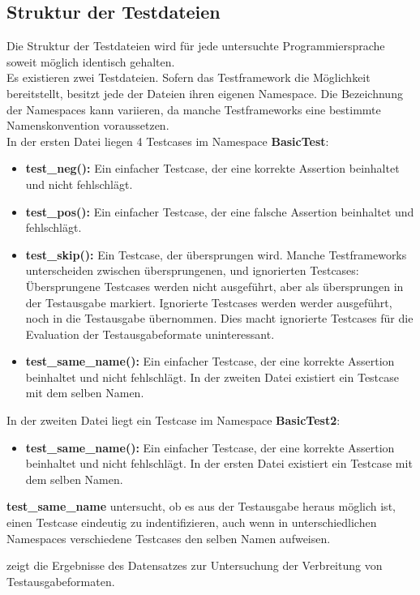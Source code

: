 \subsection{Struktur der Testdateien}
Die Struktur der Testdateien wird für jede untersuchte Programmiersprache soweit möglich identisch gehalten.\\
Es existieren zwei Testdateien. Sofern das Testframework die Möglichkeit bereitstellt, besitzt jede der Dateien ihren eigenen Namespace. Die Bezeichnung der Namespaces kann variieren, da manche Testframeworks eine bestimmte Namenskonvention voraussetzen.\\
In der ersten Datei liegen 4 Testcases im Namespace \textbf{BasicTest}:
\begin{itemize}
    \item \textbf{test\_neg():} Ein einfacher Testcase, der eine korrekte Assertion beinhaltet und nicht fehlschlägt.
    \item \textbf{test\_pos():} Ein einfacher Testcase, der eine falsche Assertion beinhaltet und fehlschlägt.
    \item \textbf{test\_skip():} Ein Testcase, der übersprungen wird. Manche Testframeworks unterscheiden zwischen übersprungenen, und ignorierten Testcases: Übersprungene Testcases werden nicht ausgeführt, aber als übersprungen in der Testausgabe markiert. Ignorierte Testcases werden werder ausgeführt, noch in die Testausgabe übernommen. Dies macht ignorierte Testcases für die Evaluation der Testausgabeformate uninteressant. 
    \item \textbf{test\_same\_name():} Ein einfacher Testcase, der eine korrekte Assertion beinhaltet und nicht fehlschlägt. In der zweiten Datei existiert ein Testcase mit dem selben Namen.
\end{itemize}
In der zweiten Datei liegt ein Testcase im Namespace \textbf{BasicTest2}:
\begin{itemize}
    \item \textbf{test\_same\_name():} Ein einfacher Testcase, der eine korrekte Assertion beinhaltet und nicht fehlschlägt. In der ersten Datei existiert ein Testcase mit dem selben Namen.
\end{itemize}
\textbf{test\_same\_name} untersucht, ob es aus der Testausgabe heraus möglich ist, einen Testcase eindeutig zu indentifizieren, auch wenn in unterschiedlichen Namespaces verschiedene Testcases den selben Namen aufweisen.

 zeigt die Ergebnisse des Datensatzes zur Untersuchung der Verbreitung von Testausgabeformaten.

